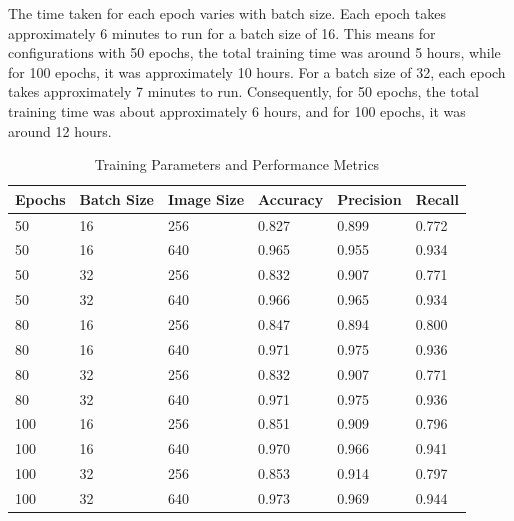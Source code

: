 The time taken for each epoch varies with batch size. Each epoch takes approximately 6 minutes to run for a 
batch size of 16. This means for configurations with 50 epochs, the total training time was around 5 hours, 
while for 100 epochs, it was approximately 10 hours. For a batch size of 32, each epoch takes approximately 
7 minutes to run. Consequently, for 50 epochs, the total training time was about approximately 6 hours, and 
for 100 epochs, it was around 12 hours.

\begin{table}[h]
    \centering
    \captionsetup{font=small}
    \renewcommand{\arraystretch}{1} %
    \begin{tabular}{@{}>{\centering\arraybackslash}m{2cm} >{\centering\arraybackslash}m{2cm} >{\centering\arraybackslash}m{2cm} >{\centering\arraybackslash}m{2cm} >{\centering\arraybackslash}m{2cm} >{\centering\arraybackslash}m{2cm}@{}}
        \toprule
        \small Epochs & \small Batch Size & \small Image Size & \small Accuracy & \small Precision & \small Recall \\
        \midrule
        \small 50 & \small 16 & \small 256 & \small 0.827 & \small 0.899 & \small 0.772 \\
        \small 50 & \small 16 & \small 640 & \small 0.965 & \small 0.955 & \small 0.934 \\
        \small 50 & \small 32 & \small 256 & \small 0.832 & \small 0.907 & \small 0.771 \\
        \small 50 & \small 32 & \small 640 & \small 0.966 & \small 0.965 & \small 0.934 \\
        \small 80 & \small 16 & \small 256 & \small 0.847 & \small 0.894 & \small 0.800 \\
        \small 80 & \small 16 & \small 640 & \small 0.971 & \small 0.975 & \small 0.936 \\
        \small 80 & \small 32 & \small 256 & \small 0.832 & \small 0.907 & \small 0.771 \\
        \small 80 & \small 32 & \small 640 & \small 0.971 & \small 0.975 & \small 0.936 \\
        \small 100 & \small 16 & \small 256 & \small 0.851 & \small 0.909 & \small 0.796 \\
        \small 100 & \small 16 & \small 640 & \small 0.970 & \small 0.966 & \small 0.941 \\
        \small 100 & \small 32 & \small 256 & \small 0.853 & \small 0.914 & \small 0.797 \\
        \small 100 & \small 32 & \small 640 & \small 0.973 & \small 0.969 & \small 0.944 \\
        \bottomrule
    \end{tabular}
    \caption{Training Parameters and Performance Metrics}
    \label{tab:performance}
\end{table}

